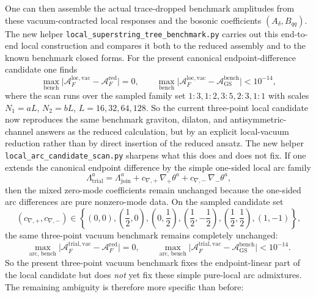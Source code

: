 \documentclass[11pt]{article}
\numberwithin{equation}{section}
\begin{document}
One can then assemble the actual trace-dropped benchmark amplitudes from these vacuum-contracted local responses and the bosonic coefficients $(A_\delta,B_{qq})$. The new helper \texttt{local\_superstring\_tree\_benchmark.py} carries out this end-to-end local construction and compares it both to the reduced assembly and to the known benchmark closed forms. For the present canonical endpoint-difference candidate one finds
\begin{equation}
\label{eq:s14-023l}
\max_{\mathrm{bench}}
\bigl|
\mathcal{A}^{\mathrm{loc,vac}}_F-\mathcal{A}^{\mathrm{red}}_F
\bigr|
 = 0,
\qquad
\max_{\mathrm{bench}}
\bigl|
\mathcal{A}^{\mathrm{loc,vac}}_F-\mathcal{A}^{\mathrm{bench}}_{\mathrm{GS}}
\bigr|
 < 10^{-14},
\end{equation}
where the scan runs over the sampled family set
$1{:}3,1{:}2,3{:}5,2{:}3,1{:}1$ with scales
$N_1=aL$, $N_2=bL$, $L=16,32,64,128$. So the current three-point local candidate now reproduces the same benchmark graviton, dilaton, and antisymmetric-channel answers as the reduced calculation, but by an explicit local-vacuum reduction rather than by direct insertion of the reduced ansatz.
The new helper \texttt{local\_arc\_candidate\_scan.py} sharpens what this does
and does not fix. If one extends the canonical endpoint difference by the simple
one-sided local arc family
\begin{equation}
\label{eq:s14-023m}
\Lambda_{\mathrm{trial}}^a
=
\Lambda_{\mathrm{join}}^a
+c_{\nabla,+}\,\nabla_+\theta^a
+c_{\nabla,-}\,\nabla_-\theta^a,
\end{equation}
then the mixed zero-mode coefficients remain unchanged because the one-sided arc
differences are pure nonzero-mode data. On the sampled candidate set
\[
(c_{\nabla,+},c_{\nabla,-})
\in
\left\{
(0,0),\left(\frac12,0\right),\left(0,\frac12\right),
\left(\frac12,-\frac12\right),\left(\frac12,\frac12\right),(1,-1)
\right\},
\]
the same three-point vacuum benchmark remains completely unchanged:
\begin{equation}
\label{eq:s14-023n}
\max_{\mathrm{arc},\,\mathrm{bench}}
\bigl|
\mathcal{A}^{\mathrm{trial,vac}}_F-\mathcal{A}^{\mathrm{red}}_F
\bigr|
=0,
\qquad
\max_{\mathrm{arc},\,\mathrm{bench}}
\bigl|
\mathcal{A}^{\mathrm{trial,vac}}_F-\mathcal{A}^{\mathrm{bench}}_{\mathrm{GS}}
\bigr|
<10^{-14}.
\end{equation}
So the present three-point vacuum benchmark fixes the endpoint-linear part of
the local candidate but does \emph{not} yet fix these simple pure-local arc
admixtures. The remaining ambiguity is therefore more specific than before:
\end{document}
